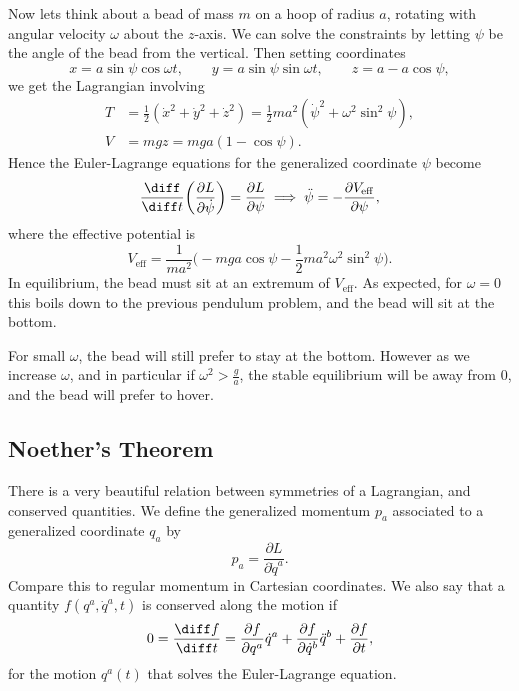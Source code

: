 \documentclass[12pt]{article}
\begin{document}
Now lets think about a bead of mass $m$ on a hoop of radius $a$, rotating with angular velocity $\omega$ about the $z$-axis. We can solve the constraints by letting $\psi$ be the angle of the bead from the vertical. Then setting coordinates
\[
x = a \sin \psi \cos \omega t, \qquad y = a \sin \psi \sin \omega t, \qquad z = a - a \cos \psi,
\]
we get the Lagrangian involving
\begin{align*}
	T &= \frac{1}{2}(\dot x^2 + \dot y^2 + \dot z^2) = \frac{1}{2} ma^2 (\dot \psi^2 + \omega^2 \sin^2 \psi),\\
	V &= mgz = mga(1 - \cos \psi).
\end{align*}
Hence the Euler-Lagrange equations for the generalized coordinate $\psi$ become
\[
\frac{\diff}{\diff t} \biggl( \frac{\partial L}{\partial \dot \psi} \biggr) = \frac{\partial L}{\partial \psi} \implies \ddot \psi = -\frac{\partial V_{\mathrm{eff}}}{\partial \psi},
\]
where the effective potential is
\[
V_{\mathrm{eff}} = \frac{1}{ma^2} \biggl(-mga \cos \psi - \frac{1}{2} ma^2 \omega^2 \sin^2 \psi\biggr).
\]
In equilibrium, the bead must sit at an extremum of $V_{\mathrm{eff}}$. As expected, for $\omega = 0$ this boils down to the previous pendulum problem, and the bead will sit at the bottom.

For small $\omega$, the bead will still prefer to stay at the bottom. However as we increase $\omega$, and in particular if $\omega^2 > \frac{g}{a}$, the stable equilibrium will be away from $0$, and the bead will prefer to hover.

\subsection{Noether's Theorem}
\label{sub:noe_thm}

There is a very beautiful relation between symmetries of a Lagrangian, and conserved quantities. We define the generalized momentum $p_a$ associated to a generalized coordinate $q_a$ by
\[
p_a = \frac{\partial L}{\partial \dot q^a}.
\]
Compare this to regular momentum in Cartesian coordinates. We also say that a quantity $f(q^a, \dot q^a, t)$ is conserved along the motion if
\[
0 = \frac{\diff f}{\diff t} = \frac{\partial f}{\partial q^a} \dot q^a + \frac{\partial f}{\partial \dot q^b} \ddot q^b + \frac{\partial f}{\partial t},
\]
for the motion $q^a(t)$ that solves the Euler-Lagrange equation.
\end{document}
